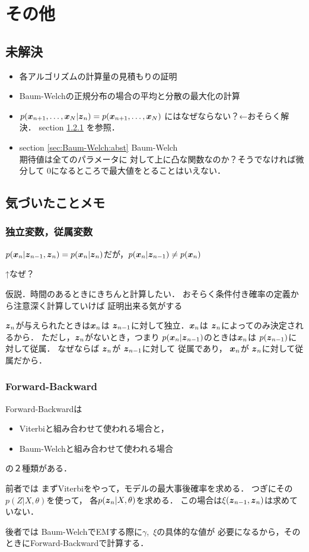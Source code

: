 \section{その他}
\label{sec:others}
\subsection{未解決}
\label{subsec:others:I-don't-know}
\begin{itemize}
\item 各アルゴリズムの計算量の見積もりの証明
\item Baum-Welchの正規分布の場合の平均と分散の最大化の計算
\item $p(\mbox{\boldmath $x$}_{n+1},\dots,\mbox{\boldmath $x$}_N|\mbox{\boldmath $z$}_n)=p(\mbox{\boldmath $x$}_{n+1},\dots,\mbox{\boldmath $x$}_N)$
  にはなぜならない？←おそらく解決．
  section \ref{subsubsec:others:notice:depend-independ} を参照．\\
\item section \ref{sec:Baum-Welch:abst} Baum-Welch \\
  期待値は全てのパラメータに
  対して上に凸な関数なのか？そうでなければ微分して
  $0$になるところで最大値をとることはいえない．
\end{itemize}
\subsection{気づいたことメモ}
\label{subsec:others:notice}
\subsubsection{独立変数，従属変数}
\label{subsubsec:others:notice:depend-independ}
$p(\mbox{\boldmath $x$}_n|\mbox{\boldmath $z$}_{n-1},\mbox{\boldmath $z$}_n)=p(\mbox{\boldmath $x$}_n|\mbox{\boldmath $z$}_n)$だが，$p(\mbox{\boldmath $x$}_n|\mbox{\boldmath $z$}_{n-1})\neq p(\mbox{\boldmath $x$}_n)$

↑なぜ？

仮説．時間のあるときにきちんと計算したい．
おそらく条件付き確率の定義から注意深く計算していけば
証明出来る気がする

$\mbox{\boldmath $z$}_n$が与えられたときは$\mbox{\boldmath $x$}_n$は
$\mbox{\boldmath $z$}_{n-1}$に対して独立．$\mbox{\boldmath $x$}_n$は
$\mbox{\boldmath $z$}_n$によってのみ決定されるから．
ただし，$\mbox{\boldmath $z$}_n$がないとき，つまり
$p(\mbox{\boldmath $x$}_n|\mbox{\boldmath $z$}_{n-1})$のときは$\mbox{\boldmath $x$}_n$は
$p(\mbox{\boldmath $z$}_{n-1})$に対して従属．
なぜならば $\mbox{\boldmath $z$}_n$が $\mbox{\boldmath $z$}_{n-1}$に対して
従属であり， $\mbox{\boldmath $x$}_n$が $\mbox{\boldmath $z$}_n$に対して従属だから．
\subsubsection{Forward-Backward}
\label{subsec:others:notice:fw-bw}
Forward-Backwardは
\begin{itemize}
\item Viterbiと組み合わせて使われる場合と，
\item Baum-Welchと組み合わせて使われる場合
\end{itemize}
の２種類がある．

前者では
まずViterbiをやって，モデルの最大事後確率を求める．
つぎにその$p(Z|X,\theta)$を使って，
各$p(\mbox{\boldmath $z$}_n|X,\theta)$を求める．
この場合は$\xi(\mbox{\boldmath $z$}_{n-1},\mbox{\boldmath $z$}_n)$は求めていない．

後者では
Baum-WelchでEMする際に$\gamma$,\ $\xi$の具体的な値が
必要になるから，そのときにForward-Backwardで計算する．
